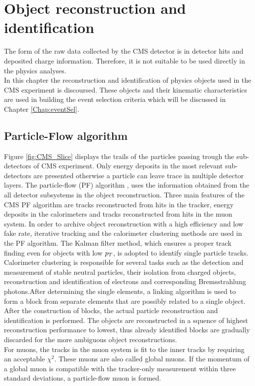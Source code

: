 \chapter{Object reconstruction and identification}
\minitoc
The form of the raw data collected by the CMS detector is in detector hits and deposited charge information. Therefore, it is not suitable to be used directly in the physics analyses.\\
In this chapter the reconstruction and identification of physics objects used in the CMS experiment is discoursed.
These objects and their kinematic characteristics are used in building the event selection criteria which will be discussed in Chapter \ref{Chap:eventSel}.
\section{Particle-Flow algorithm}
\label{sec:PF}
Figure \ref{fig:CMS_Slice} displays the trails of the particles passing trough the sub-detectors of CMS experiment. Only energy deposits in the most relevant sub-detectors are presented otherwise a particle can leave trace in multiple detector layers. The particle-flow (PF) algorithm \cite{PF,PF2}, uses the information obtained from the all detector subsystems in the object reconstruction. Three main features of the CMS PF algorithm are tracks reconstructed from hits in the tracker, energy deposits in the calorimeters and tracks reconstructed from hits in the muon system. In order to archive object reconstruction with a high efficiency and low fake rate, iterative tracking and the calorimeter clustering methods are used in the PF algorithm. The Kalman filter \cite{KalmanFilt} method, which ensures a proper track finding even for objects with low $p_T$, is adopted to identify single particle tracks. Calorimeter clustering is responsible for several tasks such as the detection and measurement of stable neutral particles, their isolation from charged objects, reconstruction and identification of electrons and corresponding Bremsstrahlung photons.After determining the single elements, a linking algorithm is used to form a block from separate elements that are possibly related to a single object. After the construction of blocks, the actual particle reconstruction and identification is performed. The objects are reconstructed in a squence of highest reconstruction performance to lowest, thus already identified blocks are gradually discarded for the more ambiguous object reconstructions. \\
For muons, the tracks in the muon system is fit to the inner tracks by requiring an acceptable $\chi^2$. These muons are also called global muons. If the momentum of a global muon is compatible with the tracker-only measurement within three standard deviations, a particle-flow muon is formed. \\
